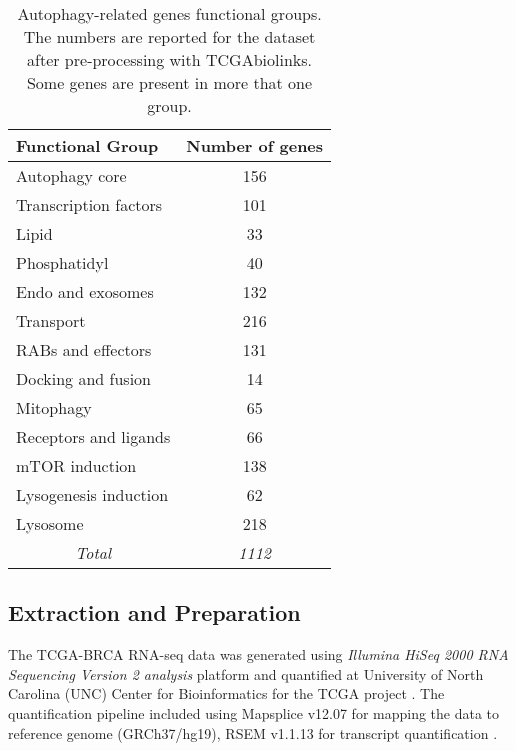     
            \begin{table}[!htbp]
            \centering
            \caption{Autophagy-related genes functional groups. The numbers are reported for the dataset after pre-processing with TCGAbiolinks. Some genes are present in more that one group. }
            \label{table:autophagy}
            \begin{tabular}{l|c}
            \small
            \textbf{Functional Group} & \multicolumn{1}{l}{\textbf{Number of genes}} \\ \hline
            Autophagy core & 156 \\ \hline
            Transcription factors & 101 \\ \hline
            Lipid & 33 \\ \hline
            Phosphatidyl & 40 \\ \hline
            Endo and exosomes & 132 \\ \hline
            Transport & 216 \\ \hline
            RABs and effectors & 131 \\ \hline
            Docking and fusion & 14 \\ \hline
            Mitophagy & 65 \\ \hline
            Receptors and ligands & 66 \\ \hline
            mTOR induction & 138 \\ \hline
            Lysogenesis induction & 62 \\ \hline
            Lysosome & 218 \\ \hline
            \multicolumn{1}{c|}{\textit{Total}} & \textit{1112}
            \end{tabular}
            \end{table}
            
            
            
            
    \subsection{Extraction and Preparation}
    
    The TCGA-BRCA RNA-seq data was generated using \textit{Illumina HiSeq 2000 RNA Sequencing Version 2 analysis} platform and quantified at University of North Carolina (UNC) Center for Bioinformatics for the TCGA project \cite{UniversityofNorthCarolinaUNCCenterforBioinfromatics2013TCGAData}. The quantification pipeline included  using Mapsplice v12.07 \cite{wang2010mapsplice} for mapping the data to reference genome (GRCh37/hg19), RSEM v1.1.13 \cite{li2011rsem} for transcript quantification \cite{UniversityofNorthCarolinaUNCCenterforBioinfromatics2013TCGAData}. 

